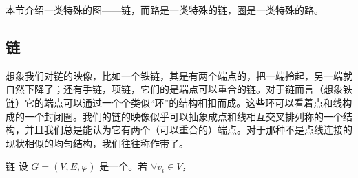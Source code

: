 
本节介绍一类特殊的图——链，而路是一类特殊的链，圈是一类特殊的路。

\subsection{链}
想象我们对链的映像，比如一个铁链，其是有两个端点的，把一端拎起，另一端就自然下降了；还有手链，项链，它们的是端点可以重合的链。对于链而言（想象铁链）它的端点可以通过一个个类似“环”的结构相扣而成。这些环可以看着点和线构成的一个封闭圈。我们的链的映像似乎可以抽象成点和线相互交叉排列称的一个结构，并且我们总是能认为它有两个（可以重合的）端点。对于那种不是点线连接的现状相似的均匀结构，我们往往称作带了。

\begin{definition}{链}
设 $G=(V,E,\varphi)$ 是一个。若 $\forall v_i\in V$，
\end{definition}














